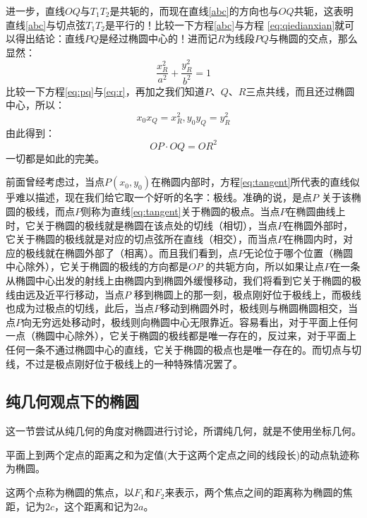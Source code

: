 进一步，直线$OQ$与$T_1T_2$是共轭的，而现在直线\ref{abc}的方向也与$OQ$共轭，这表明直线\ref{abc}与切点弦$T_1T_2$是平行的！比较一下方程\ref{abc}与方程
\ref{eq:qiedianxian}就可以得出结论：直线$PQ$是经过椭圆中心的！进而记$R$为线段$PQ$与椭圆的交点，那么显然：
\begin{equation}
\frac{x_R^2}{a^2}+\frac{y_R^2}{b^2}=1 \label{eq:r}
\end{equation}
比较一下方程\ref{eq:pq}与\ref{eq:r}，再加之我们知道$P$、$Q$、$R$三点共线，而且还过椭圆中心，所以：
\begin{equation}
x_0 x_Q=x_R^2,y_0 y_Q=y_R^2
\end{equation}
由此得到：
\begin{equation}
OP\cdot OQ = OR^2
\end{equation}
一切都是如此的完美。

前面曾经考虑过，当点$P(x_0,y_0)$在椭圆内部时，方程\ref{eq:tangent}所代表的直线似乎难以描述，现在我们给它取一个好听的名字：极线。准确的说，是点$P$ 关于该椭圆的极线，而点$P$则称为直线\ref{eq:tangent}关于椭圆的极点。当点$P$在椭圆曲线上时，它关于椭圆的极线就是椭圆在该点处的切线（相切），当点$P$在椭圆外部时，它关于椭圆的极线就是对应的切点弦所在直线（相交），而当点$P$在椭圆内时，对应的极线就在椭圆外部了（相离）。而且我们看到，点$P$无论位于哪个位置（椭圆中心除外），它关于椭圆的极线的方向都是$OP$ 的共轭方向，所以如果让点$P$在一条从椭圆中心出发的射线上由椭圆内到椭圆外缓慢移动，我们将看到它关于椭圆的极线由远及近平行移动，当点$P$ 移到椭圆上的那一刻，极点刚好位于极线上，而极线也成为过极点的切线，此后，当点$P$移动到椭圆外时，极线则与椭圆椭圆相交，当点$P$向无穷远处移动时，极线则向椭圆中心无限靠近。容易看出，对于平面上任何一点（椭圆中心除外），它关于椭圆的极线都是唯一存在的，反过来，对于平面上任何一条不通过椭圆中心的直线，它关于椭圆的极点也是唯一存在的。而切点与切线，不过是极点刚好位于极线上的一种特殊情况罢了。

\subsection{纯几何观点下的椭圆}
\label{sec:oval-on-geometry}

这一节尝试从纯几何的角度对椭圆进行讨论，所谓纯几何，就是不使用坐标几何。

\begin{definition}
  平面上到两个定点的距离之和为定值(大于这两个定点之间的线段长)的动点轨迹称为椭圆。
\end{definition}

这两个点称为椭圆的焦点，以$F_1$和$F_2$来表示，两个焦点之间的距离称为椭圆的焦距，记为$2c$，这个距离和记为$2a$。

